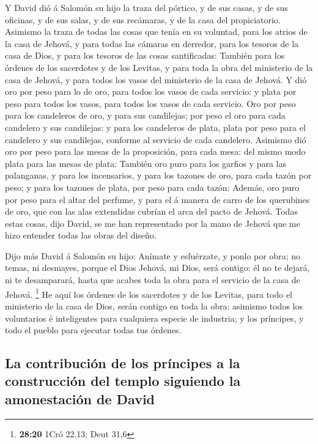  Y David dió á Salomón su hijo la traza del pórtico, y de
sus casas, y de sus oficinas, y de sus salas, y de sus recámaras, y de
la casa del propiciatorio.  Asimismo la traza de todas
las cosas que tenía en su voluntad, para los atrios de la casa de
Jehová, y para todas las cámaras en derredor, para los tesoros de la
casa de Dios, y para los tesoros de las cosas santificadas:
 También para los órdenes de los sacerdotes y de los
Levitas, y para toda la obra del ministerio de la casa de Jehová, y para
todos los vasos del ministerio de la casa de Jehová.  Y
dió oro por peso para lo de oro, para todos los vasos de cada servicio:
y plata por peso para todos los vasos, para todos los vasos de cada
servicio.  Oro por peso para los candeleros de oro, y
para sus candilejas; por peso el oro para cada candelero y sus
candilejas: y para los candeleros de plata, plata por peso para el
candelero y sus candilejas, conforme al servicio de cada candelero.
 Asimismo dió oro por peso para las mesas de la
proposición, para cada mesa: del mismo modo plata para las mesas de
plata:  También oro puro para los garfios y para las
palanganas, y para los incensarios, y para los tazones de oro, para cada
tazón por peso; y para los tazones de plata, por peso para cada tazón:
 Además, oro puro por peso para el altar del perfume, y
para el á manera de carro de los querubines de oro, que con las alas
extendidas cubrían el arca del pacto de Jehová.  Todas
estas cosas, dijo David, se me han representado por la mano de Jehová
que me hizo entender todas las obras del diseño.

 Dijo más David á Salomón su hijo: Anímate y esfuérzate,
y ponlo por obra; no temas, ni desmayes, porque el Dios Jehová, mi Dios,
será contigo: él no te dejará, ni te desamparará, hasta que acabes toda
la obra para el servicio de la casa de Jehová. \footnote{\textbf{28:20}
  1Cró 22,13; Deut 31,6}  He aquí los órdenes de los
sacerdotes y de los Levitas, para todo el ministerio de la casa de Dios,
serán contigo en toda la obra: asimismo todos los voluntarios é
inteligentes para cualquiera especie de industria; y los príncipes, y
todo el pueblo para ejecutar todas tus órdenes.

\hypertarget{la-contribuciuxf3n-de-los-pruxedncipes-a-la-construcciuxf3n-del-templo-siguiendo-la-amonestaciuxf3n-de-david}{%
\subsection{La contribución de los príncipes a la construcción del
templo siguiendo la amonestación de
David}\label{la-contribuciuxf3n-de-los-pruxedncipes-a-la-construcciuxf3n-del-templo-siguiendo-la-amonestaciuxf3n-de-david}}

